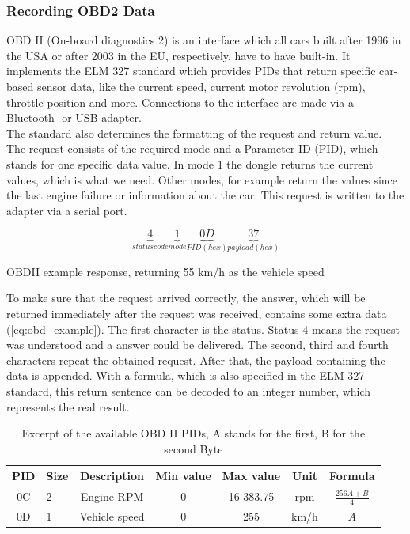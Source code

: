 \subsubsection{Recording OBD2 Data}
OBD II (On-board diagnostics 2) is an interface which all cars built after 1996 in the USA or after 2003 in the EU, respectively, have to have built-in. It implements the ELM 327 standard which provides PIDs that return specific car-based sensor data, like the current speed, current motor revolution (rpm), throttle position and more. Connections to the interface are made via a Bluetooth- or USB-adapter.\\
The standard also determines the formatting of the request and return value.\\
The request consists of the required mode and a Parameter ID (PID), which stands for one specific data value. In mode 1 the dongle returns the current values, which is what we need. Other modes, for example return the values since the last engine failure or information about the car. This request is written to the adapter via a serial port.

\begin{equation}
	\label{eq:obd_example}
		\underbrace{4}_{status code}
		\underbrace{1}_{mode}
		\underbrace{0D}_{PID (hex)}
		\underbrace{37}_{payload (hex)}
\end{equation}
\begin{center}
	OBDII example response, returning 55 km/h as the vehicle speed
\end{center}

To make sure that the request arrived correctly, the answer, which will be returned immediately after the request was received, contains some extra data (\ref{eq:obd_example}). The first character is the status. Status 4 means the request was understood and a answer could be delivered. The second, third and fourth characters repeat the obtained request. After that, the payload containing the data is appended. With a formula, which is also specified in the ELM 327 standard, this return sentence can be decoded to an integer number, which represents the real result.

\begin{table}[!ht]
	\begin{center}
		\begin{tabularx}{\textwidth}{|c | X | c | c | c | c | c |}
			\hline
			PID & Size & Description & Min value & Max value & Unit & Formula\\ \hline
			0C & 2 & Engine RPM & 0 & 16 383.75 & rpm & $\frac{256A + B}{4}$\\ \hline
			0D & 1 & Vehicle speed & 0 & 255 & km/h & $A$\\ \hline
		\end{tabularx}
	\end{center}
	\caption{Excerpt of the available OBD II PIDs, A stands for the first, B for the second Byte}
\end{table}

